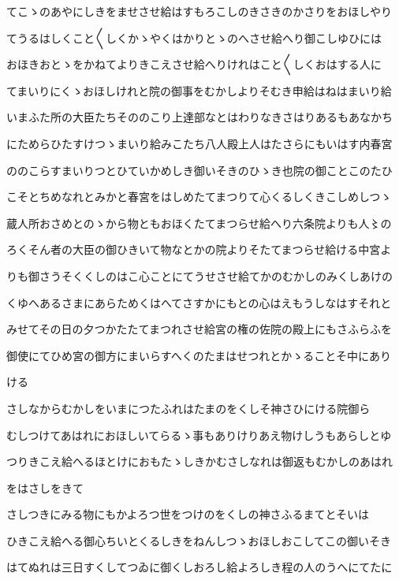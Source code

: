 \documentclass[a4paper,11pt,landscape]{ltjtarticle}
\begin{document}
\par\medskip
てこゝのあやにしきをませさせ給はすもろこしのきさきのかさりをおほしやり
\par\medskip
てうるはしくこと〱しくかゝやくはかりとゝのへさせ給へり御こしゆひには
\par\medskip
おほきおとゝをかねてよりきこえさせ給へりけれはこと〱しくおはする人に
\par\medskip
てまいりにくゝおほしけれと院の御事をむかしよりそむき申給はねはまいり給
\par\medskip
いまふた所の大臣たちそののこり上達部なとはわりなきさはりあるもあなかち
\par\medskip
にためらひたすけつゝまいり給みこたち八人殿上人はたさらにもいはす内春宮
\par\medskip
ののこらすまいりつとひていかめしき御いそきのひゝき也院の御ことこのたひ
\par\medskip
こそとちめなれとみかと春宮をはしめたてまつりて心くるしくきこしめしつゝ
\par\medskip
蔵人所おさめとのゝから物ともおほくたてまつらせ給へり六条院よりも人〻の
\par\medskip
ろくそん者の大臣の御ひきいて物なとかの院よりそたてまつらせ給ける中宮よ
\par\medskip
りも御さうそくくしのはこ心ことにてうせさせ給てかのむかしのみくしあけの
\par\medskip
くゆへあるさまにあらためくはへてさすかにもとの心はえもうしなはすそれと
\par\medskip
みせてその日の夕つかたたてまつれさせ給宮の権の佐院の殿上にもさふらふを
\par\medskip
御使にてひめ宮の御方にまいらすへくのたまはせつれとかゝることそ中にあり
\par\medskip
ける
\par\medskip
さしなからむかしをいまにつたふれはたまのをくしそ神さひにける院御ら
\par\medskip
むしつけてあはれにおほしいてらるゝ事もありけりあえ物けしうもあらしとゆ
\par\medskip
つりきこえ給へるほとけにおもたゝしきかむさしなれは御返もむかしのあはれ
\par\medskip
をはさしをきて
\par\medskip
さしつきにみる物にもかよろつ世をつけのをくしの神さふるまてとそいは
\par\medskip
ひきこえ給へる御心ちいとくるしきをねんしつゝおほしおこしてこの御いそき
\par\medskip
はてぬれは三日すくしてつゐに御くしおろし給よろしき程の人のうへにてたに
\par\medskip
\end{document}
